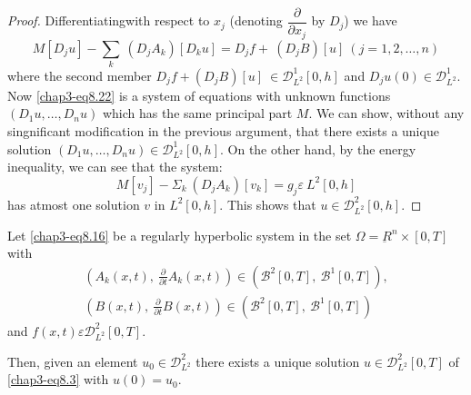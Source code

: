 \begin{proof}
Differentiating\pageoriginale with respect to $x_j$ (denoting
$\dfrac{\partial}{\partial x_j}$ by $D_j$) we have  
\begin{equation}
M [ D_j u] - \sum_{k} ~ (D_j A_k ) [ D_k u ]  = D_j f + ~ (D_j B) [ u]
~ (j = 1, 2,\ldots, n) \tag{8.22} \label{chap3-eq8.22} 
\end{equation}
where the second member $D_j f + (D_j B) [ u ] ~ \in
\mathscr{D}^{1}_{L^2} [ 0, h ]$ and $D_j u (0) \in 
\mathscr{D}^{1}_{L^2}$. 
Now \eqref{chap3-eq8.22} is a system of equations with unknown
functions $( D_1 u, 
\ldots, D_n u )$ which has the same principal part $M$. We can show,
without any singnificant modification in the previous argument, that
there exists a unique  solution $( D_1 u, \ldots, D_n u ) \in
\mathscr{D}^{1}_{L^2} [0, h]$. On the other hand, by the energy
inequality, we can see that the system: 
$$
M[v_j] - \Sigma_k ~ ( D_j A_k ) [ v_k ] = g_j \varepsilon ~ L^2 [ 0,
  h ] 
$$
has atmost one solution $v$ in $L^2 [0, h]$. This shows that $u
\in \mathscr{D}^{2}_{L^2} [0, h]$. 
\end{proof}

\setcounter{corollary}{0}
\begin{corollary}\label{chap3-sec8-coro1} %
 Let \eqref{chap3-eq8.16} be a regularly hyperbolic system in the set $\Omega =
 \underbar{R}^n \times [0, T]$ with 
 \begin{gather*}
\left(A_k (x,t), ~ \frac{\partial}{\partial t} A_k (x, t )\right) \in
   ( \mathscr{B}^2 [ 0, T ], ~ \mathscr{B}^1 [ 0, T ] ), \\ 
\left(B (x,t), ~ \frac{\partial}{\partial t} B (x,t )\right) \in (
   \mathscr{B}^2 [ 0, T ], ~ \mathscr{B}^1 [ 0, T ] )  
\end{gather*} 
and  $f (x, t ) \varepsilon \mathscr{D}^{2}_{L^2} [ 0,T]$.
\end{corollary}

Then, given an element $u_0 \in \mathscr{D}^{2}_{L^2}$ there
exists a unique solution  $u \in \mathscr{D}^{2}_{L^2} [0,T]$ of
\eqref{chap3-eq8.3} with $u (0) = u_0$.  

